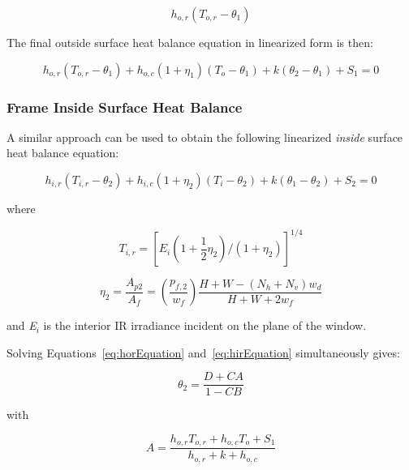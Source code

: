 \begin{equation}
{h_{o,r}}({T_{o,r}} - {\theta_1})
\end{equation}

The final outside surface heat balance equation in linearized form is then:

\begin{equation}
{h_{o,r}}({T_{o,r}} - {\theta_1}) + {h_{o,c}}(1 + {\eta_1})({T_o} - {\theta_1}) + k({\theta_2} - {\theta_1}) + {S_1} = 0
\label{eq:horEquation}
\end{equation}

\subsubsection{Frame Inside Surface Heat Balance}\label{frame-inside-surface-heat-balance}

A similar approach can be used to obtain the following linearized \emph{inside} surface heat balance equation:

\begin{equation}
{h_{i,r}}({T_{i,r}} - {\theta_2}) + {h_{i,c}}(1 + {\eta_2})({T_i} - {\theta_2}) + k({\theta_1} - {\theta_2}) + {S_2} = 0
\label{eq:hirEquation}
\end{equation}

where

\begin{equation}
{T_{i,r}} = {[{E_i}(1 + \frac{1}{2}{\eta_2})/(1 + {\eta_2})]^{1/4}}
\end{equation}

\begin{equation}
{\eta_2} = \frac{{{A_{p2}}}}{{{A_f}}} = \left( {\frac{{{p_{f,2}}}}{{{w_f}}}} \right)\frac{{H + W - ({N_h} + {N_v}){w_d}}}{{H + W + 2{w_f}}}
\end{equation}

and \emph{E\(_{i}\)} is the interior IR irradiance incident on the plane of the window.

Solving Equations~\ref{eq:horEquation} and~\ref{eq:hirEquation} simultaneously gives:

\begin{equation}
{\theta_2} = \frac{{D + CA}}{{1 - CB}}
\end{equation}

with

\begin{equation}
A = \frac{{{h_{o,r}}{T_{o,r}} + {h_{o,c}}{T_o} + {S_1}}}{{{h_{o,r}} + k + {h_{o,c}}}}
\end{equation}


